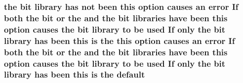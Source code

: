 \subsubsection[{\texorpdfstring{default}{default}}]{ the {\bf bit} {\bf library} has {\bf not} been {\bf this} {\bf option} causes an {\bf error} If both the {\bf bit} {\bf or} the and the {\bf bit} {\bf libraries} have been {\bf this} {\bf option} causes the {\bf bit} {\bf library} {\bf to} {\bf be} {\bf used} If only the {\bf bit} {\bf library} has been {\bf this} {\bf is} the {\bf this} {\bf option} causes an {\bf error} If both the {\bf bit} {\bf or} the and the {\bf bit} {\bf libraries} have been {\bf this} {\bf option} causes the {\bf bit} {\bf library} {\bf to} {\bf be} {\bf used} If only the {\bf bit} {\bf library} has been {\bf this} {\bf is} the default\hspace{0.3cm}{\ttfamily [new]}}\hypertarget{README_8txt_a33aad17802c273a2a50ec1e2c2d3043c}{}\label{README_8txt_a33aad17802c273a2a50ec1e2c2d3043c}
